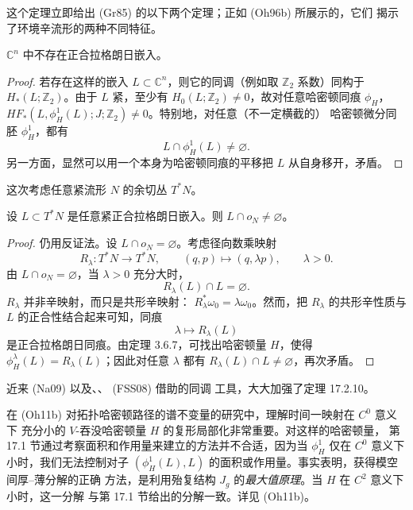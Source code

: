这个定理立即给出\personGromov{} (Gr85) 的以下两个定理；正如 (Oh96b) 所展示的，它们
揭示了环境辛流形的两种不同特征。

\begin{theorem}[\personGromov{}]
\label{thm:no-exact-lagrangian-in-Cn}
$\mathbb C^n$ 中不存在正合拉格朗日嵌入。
\end{theorem}

\begin{proof}
若存在这样的嵌入 $L\subset\mathbb C^n$，则它的\personFloer{}同调（例如取
$\mathbb Z_2$ 系数）同构于 $H_*(L;\mathbb Z_2)$。由于 $L$ 紧，至少有
$H_0(L;\mathbb Z_2)\neq0$，故对任意哈密顿同痕 $\phi_H$，
$HF_*(L,\phi_H^1(L);J;\mathbb Z_2)\neq0$。特别地，对任意（不一定横截的）
哈密顿微分同胚 $\phi_H^1$，都有
\[
 L\cap\phi_H^1(L)\neq\varnothing.
\]
另一方面，显然可以用一个本身为哈密顿同痕的平移把 $L$ 从自身移开，矛盾。
\end{proof}

这次考虑任意紧流形 $N$ 的余切丛 $T^*N$。

\begin{theorem}[\personGromov{}]
\label{thm:exact-lagrangian-meets-zero-section}
设 $L\subset T^*N$ 是任意紧正合拉格朗日嵌入。则
$L\cap o_N\neq\varnothing$。
\end{theorem}

\begin{proof}
仍用反证法。设 $L\cap o_N=\varnothing$。考虑径向数乘映射
\[
 R_\lambda:T^*N\to T^*N,\qquad(q,p)\longmapsto(q,\lambda p),\qquad\lambda>0.
\]
由 $L\cap o_N=\varnothing$，当 $\lambda>0$ 充分大时，
\begin{equation}
 R_\lambda(L)\cap L=\varnothing.
\label{eq:17-radial-displacement}
\end{equation}
$R_\lambda$ 并非辛映射，而只是共形辛映射：
$R_\lambda^*\omega_0=\lambda\omega_0$。然而，把 $R_\lambda$ 的共形辛性质与
$L$ 的正合性结合起来可知，同痕
\[
 \lambda\longmapsto R_\lambda(L)
\]
是正合拉格朗日同痕。由定理 3.6.7，可找出哈密顿量 $H$，使得
$\phi_H^\lambda(L)=R_\lambda(L)$；因此对任意 $\lambda$ 都有
$R_\lambda(L)\cap L\neq\varnothing$，再次矛盾。
\end{proof}

近来\personNadler{} (Na09) 以及\personFukaya{}、\personSeidel{}、\personIvanSmith{} (FSS08) 借助\termFukayaCategory{}的同调
工具，大大加强了定理 17.2.10。

\begin{remark}
\label{rem:c0-localization-engulfed-H}
在 (Oh11b) 对拓扑哈密顿路径的谱不变量的研究中，理解时间一映射在 $C^0$ 意义下
充分小的 $V$-吞没哈密顿量 $H$ 的\personFloer{}复形局部化非常重要。对这样的哈密顿量，
第 17.1 节通过考察面积和作用量来建立\termThickThinDichotomy{}的方法并不合适，因为当
$\phi_H^1$ 仅在 $C^0$ 意义下小时，我们无法控制对子
$(\phi_H^1(L),L)$ 的面积或作用量。事实表明，获得\personFloer{}模空间厚--薄分解的正确
方法，是利用殆复结构 $J_g$ 的\emph{最大值原理}。当 $H$ 在 $C^2$ 意义下小时，这一分解
与第 17.1 节给出的分解一致。详见 (Oh11b)。
\end{remark}
